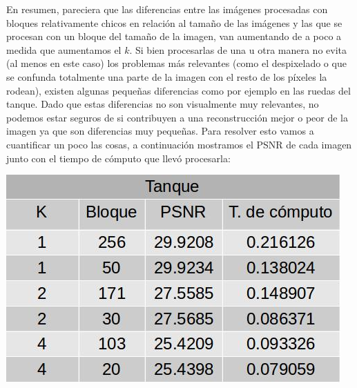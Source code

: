 \documentclass[a4paper]{article}
\begin{document}
\par En resumen, pareciera que las diferencias entre las imágenes procesadas con bloques relativamente chicos en relación al tamaño de las imágenes y las que se procesan con un bloque del tamaño de la imagen, van aumentando de a poco a medida que aumentamos el $k$. Si bien procesarlas de una u otra manera no evita (al menos en este caso) los problemas más relevantes (como el despixelado o que se confunda totalmente una parte de la imagen con el resto de los píxeles la rodean), existen algunas pequeñas diferencias como por ejemplo en las ruedas del tanque. Dado que estas diferencias no son visualmente muy relevantes, no podemos estar seguros de si contribuyen a una reconstrucción mejor o peor de la imagen ya que son diferencias muy pequeñas. Para resolver esto vamos a cuantificar un poco las cosas, a continuación mostramos el PSNR de cada imagen junto con el tiempo de cómputo que llevó procesarla:
\newline

\centerline{
\includegraphics[scale=0.5]{imagenes/tanqueTabla.jpg}
}
\end{document}
